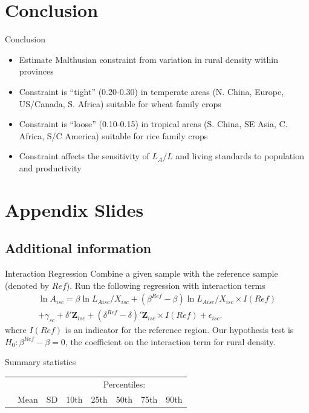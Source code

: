 \documentclass[10pt, xcolor=dvipsnames]{beamer}
\begin{document}
\section{Conclusion}

\begin{frame}{Conclusion}
\begin{itemize}
  \item Estimate Malthusian constraint from variation in rural density within provinces
  \item Constraint is ``tight'' (0.20-0.30) in temperate areas (N. China, Europe, US/Canada, S. Africa) suitable for wheat family crops
  \item Constraint is ``loose'' (0.10-0.15) in tropical areas (S. China, SE Asia, C. Africa, S/C America) suitable for rice family crops
  \item Constraint affects the sensitivity of $L_A/L$ and living standards to population and productivity
\end{itemize}
\end{frame}

\section{Appendix Slides}
\appendix

\subsection{Additional information}
\begin{frame}{Interaction Regression}\label{interaction}
Combine a given sample with the reference sample (denoted by $Ref$). Run the following regression with interaction terms
\begin{eqnarray}
    \ln A_{isc} = \beta \ln L_{Aisc}/X_{isc} + (\beta^{Ref} - \beta) \ln L_{Aisc}/X_{isc} \times I(Ref) \\ \nonumber
    + \gamma_{sc} + \delta' \mathbf{Z}_{isc} + (\delta^{Ref} - \delta)'\mathbf{Z}_{isc} \times I(Ref) + \epsilon_{isc}. \label{EQ_interaction}
\end{eqnarray}
where $I(Ref)$ is an indicator for the reference region. Our hypothesis test is $H_0: \beta^{Ref} - \beta = 0$, the coefficient on the interaction term for rural density. 

\hfill \hyperlink{testing}{}
\end{frame}

\begin{frame}{Summary statistics}\label{stats}
{\scriptsize
\begin{tabularx}{\textwidth}{lXXXXXXX}
\midrule
 &      &            & \multicolumn{5}{c}{Percentiles:} \\ \cmidrule{4-8}
 & Mean & SD  & 10th    & 25th    & 50th & 75th & 90th \\
\midrule

\midrule
\end{tabularx}
}

\hfill \hyperlink{data}{}
\end{frame}
\end{document}

